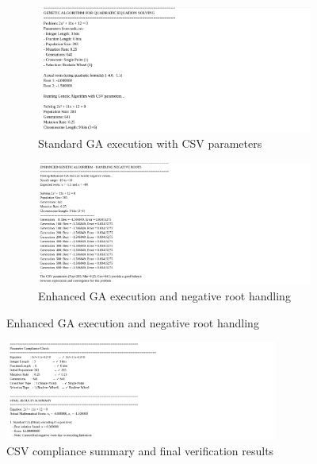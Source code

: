 \documentclass[11pt,a4paper]{article}
\begin{document}
\begin{figure}[H]
    \centering
    \begin{subfigure}[b]{0.45\textwidth}
        \includegraphics[width=\textwidth]{outputs/ouput1.png}
        \caption{Standard GA execution with CSV parameters}
        \label{fig:output1}
    \end{subfigure}
    \hfill
    \begin{subfigure}[b]{0.45\textwidth}
        \includegraphics[width=\textwidth]{outputs/ouput2.png}
        \caption{Enhanced GA execution and negative root handling}
        \label{fig:output2}
    \end{subfigure}
\end{figure}

\begin{figure}[H]
    \centering
    \includegraphics[width=0.8\textwidth]{outputs/output3.png}
    \caption{CSV compliance summary and final verification results}
    \label{fig:output3}
\end{figure}
\end{document}
